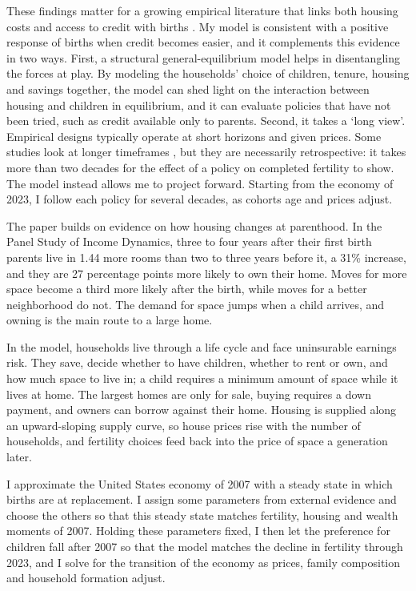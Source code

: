These findings matter for a growing empirical literature that links both
housing costs and access to credit with births
\citep{dettlingHousePricesBirth2014,lovenheimFamilyWealthShocks2013,hacamoBabiesMortgageDeregulation2021,cummingMonetaryPolicyBirth2024,dettlingKearney2026,vandoornikFazioRamadoraiSkrastinsHousingFertility2025}.
My model is consistent with a positive response of births when credit becomes
easier, and it complements this evidence in two ways. First, a structural general-equilibrium model helps in disentangling the forces at play. By modeling the households' choice of children, tenure, housing and savings together, the model can shed light on the interaction between housing and children in equilibrium, and it can evaluate policies that have not been tried, such as credit available only to parents. Second, it takes a `long view'. Empirical designs typically operate at short horizons and given prices. Some studies look at longer timeframes
\citep{dettlingKearney2026,vandoornikFazioRamadoraiSkrastinsHousingFertility2025},
but they are necessarily retrospective: it takes more than two decades for
the effect of a policy on completed fertility to show. The model instead allows me to project forward. Starting from the economy of 2023, I follow each policy for several decades, as cohorts age and prices adjust.

The paper builds on evidence on how housing changes at parenthood. In the Panel Study of Income
Dynamics, three to four years after their first birth parents live in 1.44
more rooms than two to three years before it, a 31\% increase, and they are
27 percentage points more likely to own their home. Moves for more space
become a third more likely after the birth, while moves for a better
neighborhood do not. The demand for space jumps when a child arrives, and
owning is the main route to a large home.

In the model, households live through a life cycle and face uninsurable
earnings risk. They save, decide whether to have children, whether to rent or
own, and how much space to live in; a child requires a minimum amount of space
while it lives at home. The largest homes are only for sale, buying requires
a down payment, and owners can borrow against their home. Housing is supplied
along an upward-sloping supply curve, so house prices rise with the number of
households, and fertility choices feed back into the price of space a
generation later.

I approximate the United States economy of
2007 with a steady state in which births are at replacement. I assign some
parameters from external evidence and choose the others so that this steady
state matches fertility, housing and wealth moments of 2007. Holding these
parameters fixed, I then let the preference for children fall after 2007 so
that the model matches the decline in fertility through 2023, and I solve for
the transition of the economy as prices, family composition and household
formation adjust.

